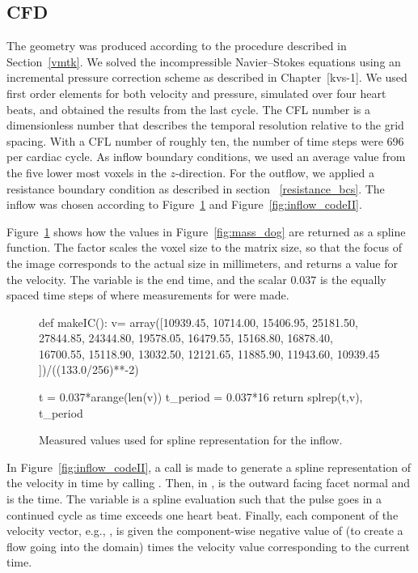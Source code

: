 \subsection{CFD}

The geometry was produced according to the procedure described in
Section~\ref{vmtk}. We solved the incompressible Navier--Stokes
equations using an incremental pressure correction scheme as described
in Chapter~[kvs-1]. We used first order elements for both velocity and
pressure, simulated over four heart beats, and obtained the results
from the last cycle. The CFL number is a dimensionless number that
describes the temporal resolution relative to the grid spacing.  With
a CFL number of roughly ten, the number of time steps were 696 per
cardiac cycle. As inflow boundary conditions, we used an average value
from the five lower most voxels in the $z$-direction. For the outflow,
we applied a resistance boundary condition as described in section
~\ref{resistance_bcs}. The inflow was chosen according to
Figure~\ref{fig:inflow_codeI} and Figure~\ref{fig:inflow_codeII}.

Figure~\ref{fig:inflow_codeI} shows how the values in
Figure~\ref{fig:mass_dog} are returned as a spline function. The
factor  scales the voxel size to the matrix size,
so that the focus of the image corresponds to the actual size in
millimeters, and returns a value for the velocity. The 
variable is the end time, and the scalar $0.037$ is the equally spaced
time steps of where measurements for  were made.

\begin{figure}
  \begin{center}
    \begin{python}
def makeIC():
    v= array([10939.45, 10714.00, 15406.95, 25181.50, 27844.85,
	      24344.80, 19578.05, 16479.55, 15168.80, 16878.40,
	      16700.55, 15118.90, 13032.50, 12121.65, 11885.90,
	      11943.60, 10939.45 ])/((133.0/256)**-2)

    t = 0.037*arange(len(v))
    t_period = 0.037*16
    return splrep(t,v), t_period
    \end{python}
    \caption{Measured values used for spline representation for the inflow.}
    \label{fig:inflow_codeI}
  \end{center}
\end{figure}

In Figure~\ref{fig:inflow_codeII}, a call is made to generate a spline
representation of the velocity in time by calling .
Then, in ,  is the outward facing facet normal
and  is the time. The variable  is a spline evaluation
such that the pulse goes in a continued cycle as time exceeds one
heart beat. Finally, each component of the velocity vector, e.g.,
, is given the component-wise negative value of 
(to create a flow going into the domain) times the velocity value
corresponding to the current time.

